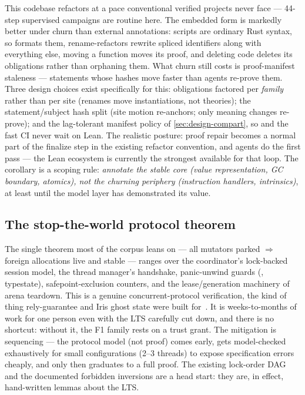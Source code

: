 This codebase refactors at a pace conventional verified projects never
face --- 44-step supervised campaigns are routine here. The embedded
form is markedly better under churn than external annotations:
scripts are ordinary Rust syntax, so  formats them,
rename-refactors rewrite spliced identifiers along with everything
else, moving a function moves its proof, and deleting code deletes its
obligations rather than orphaning them. What churn still costs is
proof-manifest staleness --- statements whose hashes move faster than
agents re-prove them. Three design choices exist specifically for
this: obligations factored per \emph{family} rather than per site
(renames move instantiations, not theories); the statement/subject
hash split (site motion re-anchors; only meaning changes re-prove);
and the lag-tolerant manifest policy of \cref{sec:design-compart}, so
 and the fast CI never wait on Lean. The realistic
posture: proof repair becomes a normal part of the finalize step in
the existing refactor convention, and agents do the first pass --- the
Lean ecosystem is currently the strongest available for that loop. The
corollary is a scoping rule: \emph{annotate the stable core (value
representation, GC boundary, atomics), not the churning periphery
(instruction handlers, intrinsics)}, at least until the model layer
has demonstrated its value.

\subsection{The stop-the-world protocol theorem}
\label{sec:risks-concurrency}

The single theorem most of the corpus leans on --- all mutators parked
$\Rightarrow$ foreign allocations live and stable --- ranges over the
coordinator's lock-backed session model, the thread manager's
handshake, panic-unwind guards (,
 typestate), safepoint-exclusion counters,
and the lease/generation machinery of arena teardown. This is a
genuine concurrent-protocol verification, the kind of thing
rely-guarantee and Iris ghost state were built
for~\cite{zakowski2018,iris2018}. It is weeks-to-months of work for one
person even with the LTS carefully cut down, and there is no shortcut:
without it, the F1 family rests on a trust grant. The mitigation
is sequencing --- the protocol model (not proof) comes early, gets
model-checked exhaustively for small configurations (2--3 threads) to
expose specification errors cheaply, and only then graduates to a
full proof.
The existing lock-order DAG and the documented forbidden inversions are
a head start: they are, in effect, hand-written lemmas about the LTS.

